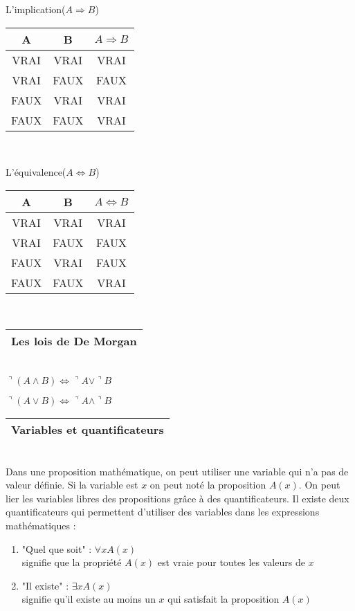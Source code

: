 \documentclass[a4]{article}
\begin{document}
L'implication($A \Rightarrow B$)

\vspace{0.1cm}
\begin{tabular}[h]{|c|c|c|}
\hline
A & B & $A\Rightarrow B$\\
\hline
VRAI & VRAI & VRAI\\
\hline
VRAI & FAUX & FAUX\\
\hline
FAUX & VRAI & VRAI\\
\hline
FAUX & FAUX & VRAI\\
\hline
\end{tabular}\\
\vspace{1cm}

L'équivalence($A \Leftrightarrow B$)

\vspace{0.1cm}
\begin{tabular}[h]{|c|c|c|}
\hline
A & B & $A \Leftrightarrow B$\\
\hline
VRAI & VRAI & VRAI\\
\hline
VRAI & FAUX & FAUX\\
\hline
FAUX & VRAI & FAUX\\
\hline
FAUX & FAUX & VRAI\\
\hline
\end{tabular}\\
\vspace{1cm}

\begin{tabular}[h]{|c|}
\hline
Les lois de De Morgan \\
\hline
\end{tabular}\\


$\urcorner (A \wedge B) \Leftrightarrow \urcorner A \vee \urcorner B$

$\urcorner (A \vee B) \Leftrightarrow \urcorner A \wedge \urcorner B$\\
\vspace{1cm}

\begin{tabular}[h]{|c|}
\hline
Variables et quantificateurs \\
\hline
\end{tabular}\\


Dans une proposition mathématique, on peut utiliser une variable qui n'a pas de valeur
définie. Si la variable est $x$ on peut noté la proposition $A(x)$.
On peut lier les variables libres des propositions grâce à des quantificateurs. 
Il existe deux quantificateurs qui permettent d'utiliser des variables dans les expressions 
mathématiques : 
\begin {enumerate}
\item "Quel que soit" : $\forall x A(x)$ \\
\vspace {1.5cm}
signifie que la propriété $A(x)$ est vraie pour toutes les valeurs de $x$
\item "Il existe" : $\exists x A(x)$ \\
\vspace {1.5cm}
signifie qu'il existe au moins un $x$ qui satisfait la proposition $A(x)$\\
\end{enumerate}
\end{document}
